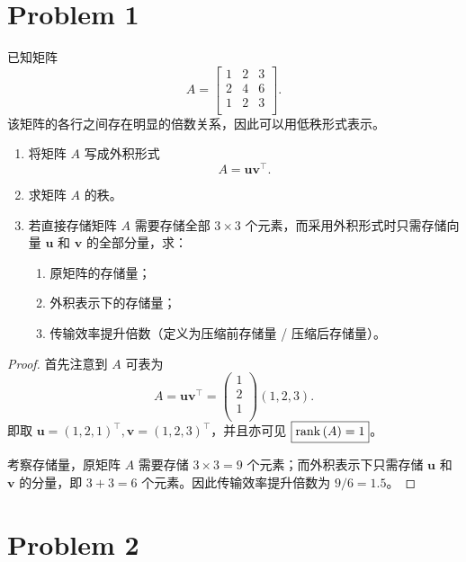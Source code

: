 \section*{Problem 1}

已知矩阵 \[
A = \begin{bmatrix}
1 & 2 & 3 \\
2 & 4 & 6 \\
1 & 2 & 3 \\
\end{bmatrix}.
\]
该矩阵的各行之间存在明显的倍数关系，因此可以用低秩形式表示。

\begin{enumerate}
    \item 将矩阵 $A$ 写成外积形式 \[A = \boldsymbol{u}\boldsymbol{v}^\top.\]
    \item 求矩阵 $A$ 的秩。
    \item 若直接存储矩阵 $A$ 需要存储全部 $3 \times 3$ 个元素，而采用外积形式时只需存储向量 $\boldsymbol{u}$ 和 $\boldsymbol{v}$ 的全部分量，求：
    \begin{enumerate}
        \item 原矩阵的存储量；
        \item 外积表示下的存储量；
        \item 传输效率提升倍数（定义为压缩前存储量 / 压缩后存储量）。
    \end{enumerate}
\end{enumerate}

\begin{proof}
首先注意到 $A$ 可表为 \[A = \boldsymbol{u} \boldsymbol{v}^\top = \begin{pmatrix}
    1 \\ 2 \\ 1 \\
\end{pmatrix} \left(1,2,3\right).\]
即取 $\boxed{\boldsymbol{u} = \left(1, 2, 1\right)^\top}, \boxed{\boldsymbol{v} = \left(1, 2, 3\right)^\top}$，并且亦可见 $\boxed{\mathrm{rank}\left(A\right) = 1}$。

考察存储量，原矩阵 $A$ 需要存储 $3 \times 3 = \boxed{9}$ 个元素；而外积表示下只需存储 $\boldsymbol{u}$ 和 $\boldsymbol{v}$ 的分量，即 $3 + 3 = \boxed{6}$ 个元素。因此传输效率提升倍数为 $9 / 6 = \boxed{1.5}$。

\end{proof}

\section*{Problem 2}

